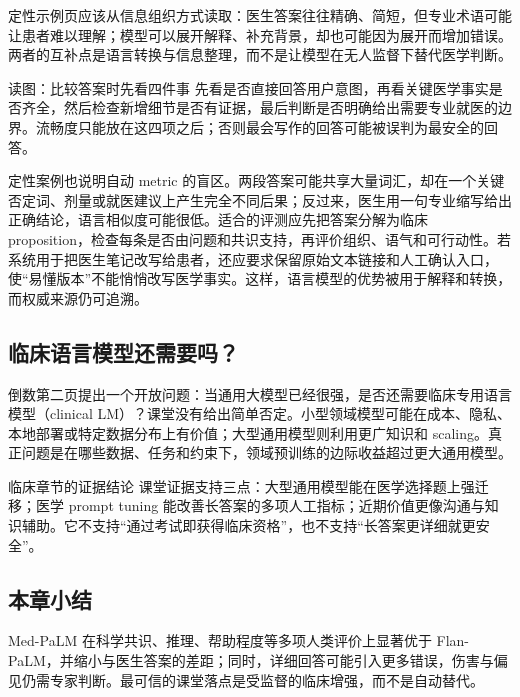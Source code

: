 定性示例页应该从信息组织方式读取：医生答案往往精确、简短，但专业术语可能让患者难以理解；模型可以展开解释、补充背景，却也可能因为展开而增加错误。两者的互补点是语言转换与信息整理，而不是让模型在无人监督下替代医学判断。

\begin{knowledgebox}{读图：比较答案时先看四件事}
先看是否直接回答用户意图，再看关键医学事实是否齐全，然后检查新增细节是否有证据，最后判断是否明确给出需要专业就医的边界。流畅度只能放在这四项之后；否则最会写作的回答可能被误判为最安全的回答。
\end{knowledgebox}

定性案例也说明自动 metric 的盲区。两段答案可能共享大量词汇，却在一个关键否定词、剂量或就医建议上产生完全不同后果；反过来，医生用一句专业缩写给出正确结论，语言相似度可能很低。适合的评测应先把答案分解为临床 proposition，检查每条是否由问题和共识支持，再评价组织、语气和可行动性。若系统用于把医生笔记改写给患者，还应要求保留原始文本链接和人工确认入口，使“易懂版本”不能悄悄改写医学事实。这样，语言模型的优势被用于解释和转换，而权威来源仍可追溯。

\subsection{临床语言模型还需要吗？}

倒数第二页提出一个开放问题：当通用大模型已经很强，是否还需要临床专用语言模型（clinical LM）？课堂没有给出简单否定。小型领域模型可能在成本、隐私、本地部署或特定数据分布上有价值；大型通用模型则利用更广知识和 scaling。真正问题是在哪些数据、任务和约束下，领域预训练的边际收益超过更大通用模型。




\begin{importantbox}{临床章节的证据结论}
课堂证据支持三点：大型通用模型能在医学选择题上强迁移；医学 prompt tuning 能改善长答案的多项人工指标；近期价值更像沟通与知识辅助。它不支持“通过考试即获得临床资格”，也不支持“长答案更详细就更安全”。
\end{importantbox}

\subsection{本章小结}

Med-PaLM 在科学共识、推理、帮助程度等多项人类评价上显著优于 Flan-PaLM，并缩小与医生答案的差距；同时，详细回答可能引入更多错误，伤害与偏见仍需专家判断。最可信的课堂落点是受监督的临床增强，而不是自动替代。


